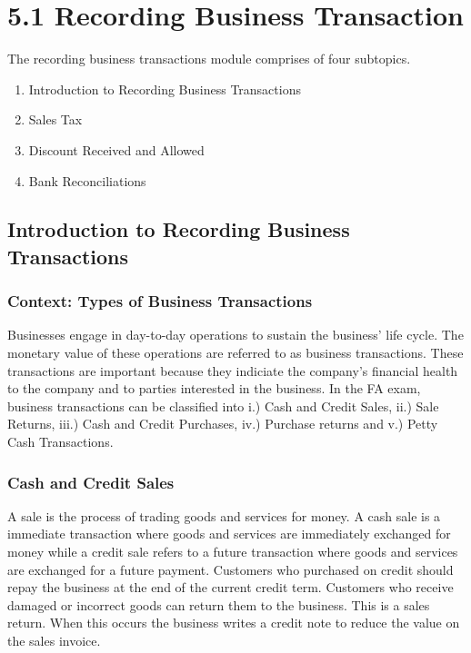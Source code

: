 \section{5.1 Recording Business Transaction}

The recording business transactions module comprises of four subtopics. 

\begin{enumerate}
    \item Introduction to Recording Business Transactions 
    \item  Sales Tax
    \item Discount Received and Allowed
    \item  Bank Reconciliations
\end{enumerate}

\subsection{Introduction to Recording Business Transactions}

\subsubsection{Context: Types of Business Transactions}

Businesses engage in day-to-day operations to sustain the business' life cycle. The monetary value of these operations are referred to as business transactions. These transactions are important because they indiciate the company's financial health to the company and to parties interested in the business. 
In the FA exam, business transactions can be classified into i.) Cash and Credit Sales, ii.) Sale Returns, iii.) Cash and Credit Purchases, iv.) Purchase returns and v.) Petty Cash Transactions.

\subsubsection{Cash and Credit Sales}

A sale is the process of trading goods and services for money. A cash sale is a immediate transaction where goods and services are immediately exchanged for money while a credit sale refers to a future transaction where goods and services are exchanged for a future payment. Customers who purchased on credit should repay the business at the end of the current credit term. Customers who receive damaged or incorrect goods can return
them to the business. This is a sales return. When this occurs the business writes a credit note to reduce the value on the sales invoice. 

